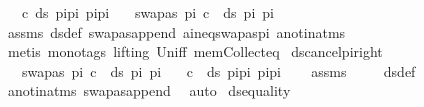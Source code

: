 \begin{isabellebody}
\ \ \ {\isachardoublequoteopen}c{\isasymin}\ ds\ {\isacharparenleft}{\kern0pt}pi{}{\isacharat}{\kern0pt}pi{\isacharparenright}{\kern0pt}\ {\isacharparenleft}{\kern0pt}pi{}{\isacharat}{\kern0pt}pi{\isacharparenright}{\kern0pt}{\isachardoublequoteclose}\isanewline
\ \ \ {\isachardoublequoteopen}swapas\ pi\ c\ {\isasymin}\ ds\ pi{}\ pi{}{\isachardoublequoteclose}\isanewline
%
\isadelimproof
\ \ %
\endisadelimproof
%
\isatagproof
{}\isamarkupfalse%
\ assms\ ds{\isacharunderscore}{\kern0pt}def\ swapas{\isacharunderscore}{\kern0pt}append\ a{\isacharunderscore}{\kern0pt}ineq{\isacharunderscore}{\kern0pt}swapas{\isacharunderscore}{\kern0pt}pi\ a{\isacharunderscore}{\kern0pt}not{\isacharunderscore}{\kern0pt}in{\isacharunderscore}{\kern0pt}atms\isanewline
\ \ \isamarkupfalse%
\ {\isacharparenleft}{\kern0pt}metis\ {\isacharparenleft}{\kern0pt}mono{\isacharunderscore}{\kern0pt}tags{\isacharcomma}{\kern0pt}\ lifting{\isacharparenright}{\kern0pt}\ Un{\isacharunderscore}{\kern0pt}iff\ mem{\isacharunderscore}{\kern0pt}Collect{\isacharunderscore}{\kern0pt}eq{\isacharparenright}{\kern0pt}%
\endisatagproof
{\isafoldproof}%
%
\isadelimproof
\isanewline
%
\endisadelimproof
\isanewline
{}\isamarkupfalse%
\ ds{\isacharunderscore}{\kern0pt}cancel{\isacharunderscore}{\kern0pt}pi{\isacharunderscore}{\kern0pt}right{\isacharcolon}{\kern0pt}\ \isanewline
\ \ \ {\isachardoublequoteopen}swapas\ pi\ c\ {\isasymin}\ ds\ pi{}\ pi{}{\isachardoublequoteclose}\isanewline
\ \ \ {\isachardoublequoteopen}c\ {\isasymin}\ ds\ {\isacharparenleft}{\kern0pt}pi{}{\isacharat}{\kern0pt}pi{\isacharparenright}{\kern0pt}\ {\isacharparenleft}{\kern0pt}pi{}{\isacharat}{\kern0pt}pi{\isacharparenright}{\kern0pt}{\isachardoublequoteclose}\isanewline
%
\isadelimproof
\ \ %
\endisadelimproof
%
\isatagproof
{}\isamarkupfalse%
\ assms\ \isanewline
\ \ \isamarkupfalse%
\ ds{\isacharunderscore}{\kern0pt}def\isanewline
\ \ \isamarkupfalse%
\ a{\isacharunderscore}{\kern0pt}not{\isacharunderscore}{\kern0pt}in{\isacharunderscore}{\kern0pt}atms\ swapas{\isacharunderscore}{\kern0pt}append\ \isamarkupfalse%
\ auto%
\endisatagproof
{\isafoldproof}%
%
\isadelimproof
\isanewline
%
\endisadelimproof
\isanewline
{}\isamarkupfalse%
\ ds{\isacharunderscore}{\kern0pt}equality{\isacharcolon}{\kern0pt}\ \isanewline

\end{isabellebody}
